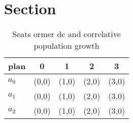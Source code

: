 \documentclass[a4paper]{article}
\begin{document}
\section{Section}

\begin{table}
\begin{adjustbox}{width=0.6\columnwidth}
\begin{tabular}{|l|l|l|l|l|}
\hline
\textbf{plan} & \multicolumn{1}{c|}{\textbf{0}} & \multicolumn{1}{c|}{\textbf{1}} & \multicolumn{1}{c|}{\textbf{2}} & \multicolumn{1}{c|}{\textbf{3}} \\ \hline
\textbf{$a_0$}  & (0,0) & (1,0) & (2,0) & (3,0) \\ \hline
\textbf{$a_1$}  & (0,0) & (1,0) & (2,0) & (3,0) \\ \hline
\textbf{$a_2$}  & (0,0) & (1,0) & (2,0) & (3,0) \\ \hline
\end{tabular}
\end{adjustbox}
\caption{Seats ormer dc and correlative population growth 
}
\end{table}
\end{document}

